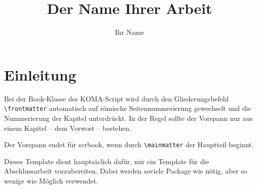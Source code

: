 \documentclass[a4paper,
	openany,							%
	headings = normal,
	toc  	 = chapterentrywithdots,
	listof = totoc,
	listof = entryprefix
]
{scrbook}
\begin{document}


\title{Der Name Ihrer Arbeit}
\author{Ihr Name}



\maketitle 						%

\tableofcontents			%


\frontmatter					%
\chapter{Einleitung}

Bei der Book-Klasse des KOMA-Script wird durch den Gliederungsbefehl \verb#\frontmatter# automatisch auf römische Seitennummerierung gewechselt und die Nummerierung der Kapitel unterdrückt. In der Regel sollte der Vorspann nur aus einem Kapitel -- dem Vorwort -- bestehen.

Der Vorspann endet für scrbook, wenn durch \verb#\mainmatter# der Hauptteil beginnt.

Dieses Template dient hauptsäclich dafür, mir ein Template für die Abschlussarbeit vorzubereiten. Dabei werden soviele Package wie nötig, aber so wenige wie Möglich verwendet.
\end{document}
